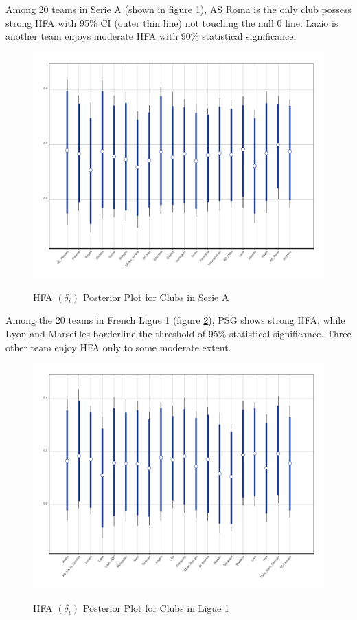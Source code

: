 \documentclass[]{interact}
\theoremstyle{plain}%
\theoremstyle{definition}
\theoremstyle{remark}
\begin{document}
Among 20 teams in Serie A (shown in figure \ref{fig3}), AS Roma is the only club possess strong HFA with 95\% CI (outer thin line) not touching the null 0 line. Lazio is another team enjoys moderate HFA with 90\% statistical significance. 

\begin{figure}
	{\includegraphics[width=0.9\linewidth]{HFA_Posterior_Serie_A.pdf}}
	\caption{HFA $(\delta_i)$ Posterior Plot for Clubs in Serie A}	
	\label{fig3}
\end{figure}

Among the 20 teams in French Ligue 1 (figure \ref{fig4}), PSG shows strong HFA, while Lyon and Marseilles borderline the threshold of 95\% statistical significance. Three other team enjoy HFA only to some moderate extent.

\begin{figure}
	{\includegraphics[width=0.9\linewidth]{HFA_Posterior_Ligue_1.pdf}}
	\caption{HFA $(\delta_i)$ Posterior Plot for Clubs in Ligue 1}	
	\label{fig4}
\end{figure}
\end{document}
